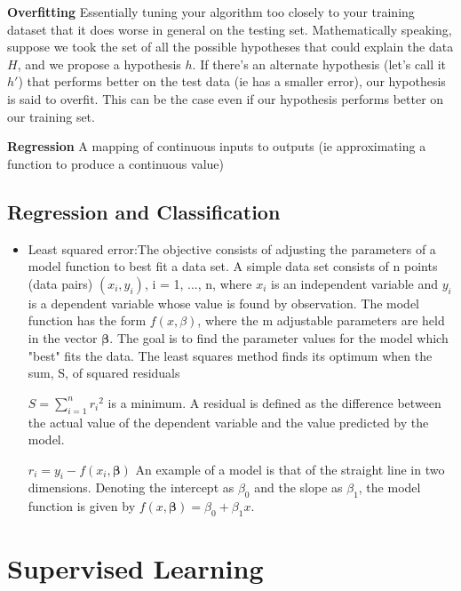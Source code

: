 \documentclass[11pt]{article}
\begin{document}
\par\noindent\hangindent=1cm \textbf{Overfitting} Essentially tuning your algorithm too closely to your training dataset that it does worse in general on the testing set. Mathematically speaking, suppose we took the set of all the possible hypotheses that could explain the data $H$, and we propose a hypothesis $h$. If there's an alternate hypothesis (let's call it $h'$) that performs better on the test data (ie has a smaller error), our hypothesis is said to overfit. This can be the case even if our hypothesis performs better on our training set.\\

\par\noindent\hangindent=1cm \textbf{Regression} A mapping of continuous inputs to outputs (ie approximating a function to produce a continuous value)\\



\subsection{Regression and Classification}
\begin{itemize}
\item Least squared error:The objective consists of adjusting the parameters of a model function to best fit a data set. A simple data set consists of n points (data pairs) $(x_i,y_i)$, i = 1, ..., n, where $x_i$ is an independent variable and $y_i$ is a dependent variable whose value is found by observation. The model function has the form $f(x,\beta)$, where the m adjustable parameters are held in the vector $\boldsymbol \beta$. The goal is to find the parameter values for the model which "best" fits the data. The least squares method finds its optimum when the sum, S, of squared residuals

$S=\sum_{i=1}^{n}{r_i}^2$
is a minimum. A residual is defined as the difference between the actual value of the dependent variable and the value predicted by the model.

$r_i=y_i-f(x_i,\boldsymbol \beta)$
An example of a model is that of the straight line in two dimensions. Denoting the intercept as $\beta_0$ and the slope as $\beta_1$, the model function is given by $f(x,\boldsymbol \beta)=\beta_0+\beta_1 x$.
\end{itemize}

\section{Supervised Learning}
\end{document}
